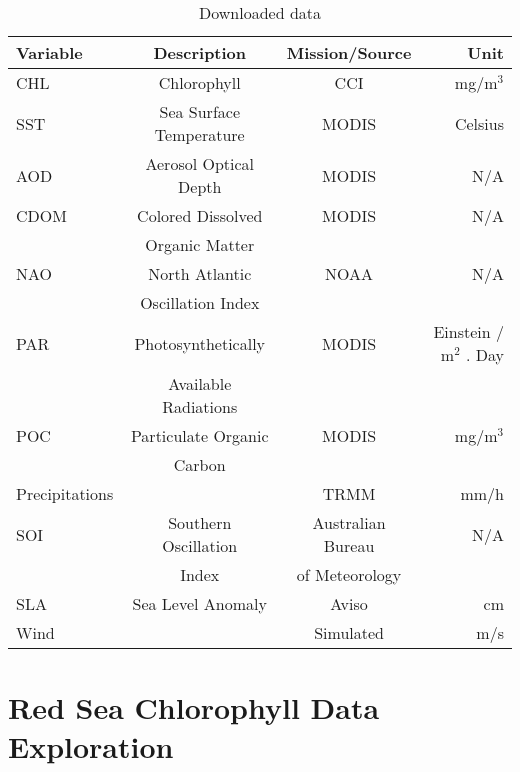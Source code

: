 \begin{table}
\centering
\begin{tabular}{l c c r}
\toprule
Variable       & Description             & Mission/Source    & Unit       \\
\midrule
CHL            & Chlorophyll             & CCI               & mg/m${}^3$ \\
SST            & Sea Surface Temperature & MODIS             & Celsius    \\
AOD            & Aerosol Optical Depth   & MODIS             & N/A        \\
CDOM           & Colored Dissolved       & MODIS             & N/A        \\
               & Organic Matter          &                   &            \\
NAO            & North Atlantic          & NOAA              & N/A        \\
               & Oscillation Index       &                   &            \\
PAR            & Photosynthetically      & MODIS             &
  Einstein / m${}^2$ . Day                                                \\
               & Available Radiations    &                   &            \\
POC            & Particulate Organic     & MODIS             & mg/m${}^3$ \\
               & Carbon                  &                   &            \\
Precipitations &                         & TRMM              & mm/h       \\
SOI            & Southern Oscillation    & Australian Bureau & N/A        \\
               & Index                   & of Meteorology    &            \\
SLA            & Sea Level Anomaly       & Aviso             & cm         \\
Wind           &                         & Simulated         & m/s        \\
\bottomrule
\end{tabular}
\caption{Downloaded data}
\label{tab:data}
\end{table}

\section{Red Sea Chlorophyll Data Exploration}

